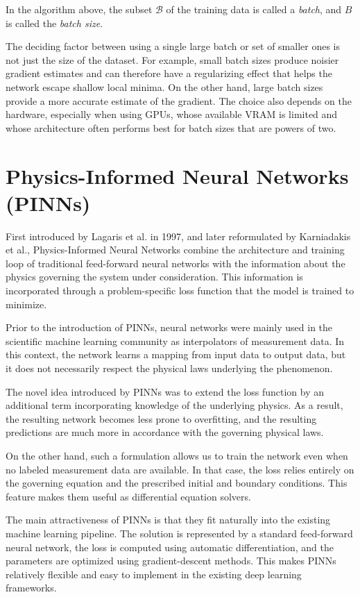 In the algorithm above, the subset $\mathcal B$ of the training data is called a \emph{batch}, and $B$ is called the \emph{batch size}.

The deciding factor between using a single large batch or set of smaller ones is not just the size of the dataset.
For example, small batch sizes produce noisier gradient estimates and can therefore have a regularizing effect that helps the network escape shallow local minima.
On the other hand, large batch sizes provide a more accurate estimate of the gradient.
The choice also depends on the hardware, especially when using GPUs, whose available VRAM is limited and whose architecture often performs best for batch sizes that are powers of two.
\cite{goodfellow}




\chapter{Physics-Informed Neural Networks (PINNs)}


First introduced by Lagaris et al. \cite{lagaris} in 1997,
and later reformulated by Karniadakis et al., Physics-Informed Neural Networks combine
the architecture and training loop of traditional feed-forward neural networks
with the information about the physics governing the system under consideration.
This information is incorporated through a problem-specific loss function that the model is trained to minimize.

Prior to the introduction of PINNs, neural networks were mainly used in the scientific machine learning community
as interpolators of measurement data. 
In this context, the network learns a mapping from input data to output data,
but it does not necessarily respect the physical laws underlying the phenomenon.

The novel idea introduced by PINNs was to extend the loss function by an additional term incorporating knowledge of the underlying physics.
As a result, the resulting network becomes less prone to overfitting, and the resulting predictions are much more in accordance with the governing physical laws.

On the other hand, such a formulation allows us to train the network even when no labeled measurement data are available.
In that case, the loss relies entirely on the governing equation and the prescribed initial and boundary conditions.
This feature makes them useful as differential equation solvers.

The main attractiveness of PINNs is that they fit naturally into the existing
machine learning pipeline. The solution is represented by a standard feed-forward
neural network, the loss is computed using automatic differentiation, and
the parameters are optimized using gradient-descent methods.
This makes PINNs relatively flexible and easy to implement in the existing deep learning frameworks.

